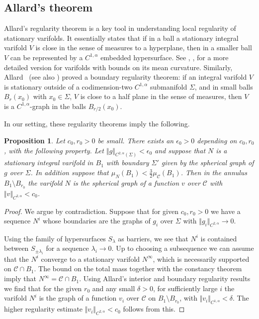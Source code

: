 \documentclass[12pt, reqno ]{amsart}
\newtheorem{prop}[theorem]{Proposition}
\numberwithin{equation}{section}
\begin{document}
\subsection{Allard's theorem}

Allard's regularity theorem is a key tool in understanding local regularity of stationary varifolds. It essentially states that if in a ball a stationary integral varifold $V$ is close in the sense of measures to a hyperplane, then in a smaller ball $V$ can be represented by a $C^{1, \alpha}$ embedded hypersurface. See \cite{simon1984lectures}, \cite{allard1972first}, \cite{DeL12} for a more detailed version for varifolds with bounds on its mean curvature. Similarly, Allard~\cite{Allardboundary} (see also \cite{Bourni}) proved a boundary regularity theorem: if an integral varifold $V$ is stationary outside of a codimension-two $C^{1,\alpha}$ submanifold $\Sigma$, and in small balls $B_r(x_0)$ with $x_0\in \Sigma$, $V$ is close to a half plane in the sense of measures, then $V$ is a $C^{1,\alpha}$-graph in the balls $B_{r/2}(x_0)$.


In our setting, these regularity theorems imply the following. 
\begin{prop}\label{prop:FromAllard}
    Let $c_0, r_0 > 0$ be small. There exists an $\epsilon_0 > 0$ depending on $c_0, r_0$, with the following property. Let $\Vert g\Vert_{C^{2,\alpha}(\Sigma)} < \epsilon_0$ and suppose that $N$ is a stationary integral varifold in $B_1$ with boundary $\Sigma'$ given by the spherical graph of $g$ over $\Sigma$. In addition suppose that $\mu_N(B_1) < \frac{3}{2} \mu_\mathcal C (B_1)$. 
    Then in the annulus $B_1\setminus B_{r_0}$ the varifold $N$ is the spherical graph of a function $v$ over $\mathcal{C}$ with $\Vert v\Vert_{C^{2,\alpha}} < c_0$. 
\end{prop}
\begin{proof}
We argue by contradiction. Suppose that for given $c_0, r_0 > 0$ we have a sequence $N^i$ whose boundaries are the graphs of $g_i$ over $\Sigma$ with $\Vert g_i\Vert_{C^{2,\alpha}} \to 0$. 

Using the family of hypersurfaces $S_\lambda$ as barriers, we see that $N^i$ is contained between $S_{\pm \lambda_i}$ for a sequence $\lambda_i\to 0$. Up to choosing a subsequence we can assume that the $N^i$ converge to a stationary varifold $N^\infty$, which is necessarily supported on $\mathcal{C}\cap B_1$. The bound on the total mass together with the constancy theorem imply that $N^\infty = \mathcal{C}\cap B_1$. Using Allard's interior and boundary regularity results~\cite{allard1972first, Allardboundary} we find that for the given $r_0$ and any small $\delta > 0$, for sufficiently large $i$ the varifold $N^i$ is the graph of a function $v_i$ over $\mathcal{C}$ on $B_1\setminus B_{r_0}$, with $\Vert v_i\Vert_{C^{1,\alpha}} < \delta$. The higher regularity estimate $\Vert v_i\Vert_{C^{2,\alpha}} < c_0$ follows from this. 
\end{proof}
\end{document}
